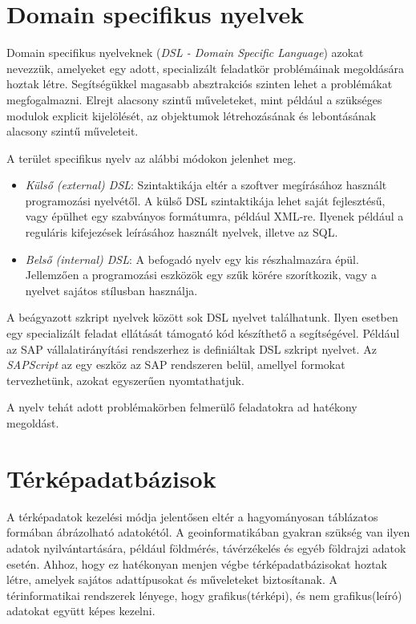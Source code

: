 
\section{Domain specifikus nyelvek}

Domain specifikus nyelveknek (\textit{DSL - Domain Specific Language}) azokat nevezzük, amelyeket egy adott, specializált feladatkör problémáinak megoldására hoztak létre. Segítségükkel magasabb absztrakciós szinten lehet a problémákat megfogalmazni. Elrejt alacsony szintű műveleteket, mint például a szükséges modulok explicit kijelölését, az objektumok létrehozásának és lebontásának alacsony szintű műveleteit.

A terület specifikus nyelv az alábbi módokon jelenhet meg.

\begin{itemize}
\item \textit{Külső (external) DSL}: Szintaktikája eltér a szoftver megírásához használt programozási nyelvétől. A külső DSL szintaktikája lehet saját fejlesztésű, vagy épülhet egy szabványos formátumra, például XML-re. Ilyenek például a reguláris kifejezések leírásához használt nyelvek, illetve az SQL.
\item \textit{Belső (internal) DSL}: A befogadó nyelv egy kis részhalmazára épül. Jellemzően a programozási eszközök egy szűk körére szorítkozik, vagy a nyelvet sajátos stílusban használja.
\end{itemize}


A beágyazott szkript nyelvek között sok DSL nyelvet találhatunk. Ilyen esetben egy specializált feladat ellátását támogató kód készíthető a segítségével. Például az SAP vállalatirányítási rendszerhez is definiáltak  DSL szkript nyelvet. Az \textit{SAPScript} az egy eszköz az SAP rendszeren belül, amellyel formokat tervezhetünk, azokat egyszerűen nyomtathatjuk.

A nyelv tehát adott problémakörben felmerülő feladatokra ad hatékony megoldást.

\section{Térképadatbázisok}

A térképadatok kezelési módja jelentősen eltér a hagyományosan táblázatos formában ábrázolható adatokétól. A geoinformatikában gyakran szükség van ilyen adatok nyilvántartására, például földmérés, távérzékelés és egyéb földrajzi adatok esetén. Ahhoz, hogy ez hatékonyan menjen végbe térképadatbázisokat hoztak létre, amelyek sajátos adattípusokat és műveleteket biztosítanak.
A térinformatikai rendszerek lényege, hogy grafikus(térképi), és nem grafikus(leíró) adatokat együtt képes kezelni.

